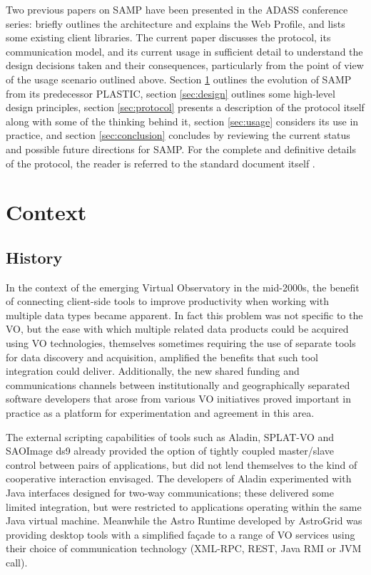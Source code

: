 \documentclass[5p]{elsarticle}
\begin{document}
Two previous papers on SAMP have been presented in the ADASS conference
series:
\citet{adassxxi_paper} briefly outlines the architecture and explains
the Web Profile, and \citet{adassxxii_bof} lists some existing
client libraries.
The current paper discusses the protocol,
its communication model, and its current usage
in sufficient detail to understand the design decisions taken
and their consequences,
particularly from the point of view of the usage scenario
outlined above.
Section \ref{sec:context} outlines the evolution of SAMP from
its predecessor PLASTIC,
section \ref{sec:design} outlines some high-level design principles,
section \ref{sec:protocol} presents a description of the protocol itself
along with some of the thinking behind it,
section \ref{sec:usage} considers its use in practice, and
section \ref{sec:conclusion} concludes by reviewing the current status
and possible future directions for SAMP.
For the complete and definitive details of the protocol,
the reader is referred to the standard document itself \citep{samp_std}.

\section{Context} \label{sec:context}

\subsection{History}

In the context of the emerging Virtual Observatory in the mid-2000s,
the benefit of connecting client-side tools to improve productivity
when working with multiple data types became apparent.
In fact this problem was not specific to the VO, 
but the ease with which multiple related data products
could be acquired using VO technologies,
themselves sometimes requiring the use of separate tools for
data discovery and acquisition,
amplified the benefits that such tool integration could deliver.
Additionally, the new shared funding and communications channels
between institutionally and geographically separated software developers
that arose from various VO initiatives
proved important in practice
as a platform for experimentation and agreement in this area.

The external scripting capabilities of tools such as Aladin, SPLAT-VO
and SAOImage ds9 already provided the option of tightly coupled master/slave
control between pairs of applications, but did not lend themselves
to the kind of cooperative interaction envisaged.
The developers of Aladin experimented with Java interfaces designed
for two-way communications; these delivered some limited integration,
but were restricted to applications operating within the same Java
virtual machine.
Meanwhile the Astro Runtime \citep{2007ASPC..376..571W} developed by
AstroGrid was providing desktop tools with a simplified fa\c{c}ade
to a range of VO services using their choice of communication
technology (XML-RPC, REST, Java RMI or JVM call).
\end{document}
